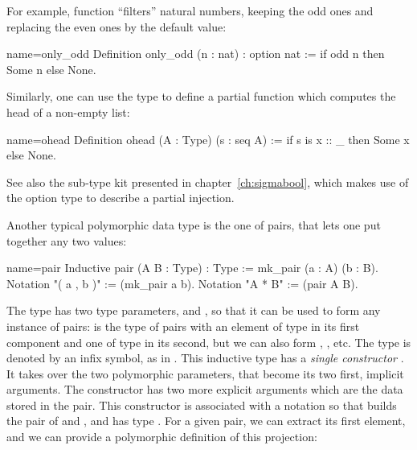 For example, function  ``filters'' natural numbers, keeping the
odd ones and replacing the even ones by the  default value:

\begin{coq}{name=only_odd}{}
Definition only_odd (n : nat) : option nat :=
  if odd n then Some n else None.
\end{coq}

Similarly, one can use the  type to define a partial function
which computes the head of a non-empty list:


\begin{coq}{name=ohead}{}
Definition ohead (A : Type) (s : seq A) :=
  if s is x :: _ then Some x else None.
\end{coq}


See also the sub-type kit presented in chapter~\ref{ch:sigmabool},
which makes use of the option type to describe a partial injection.

Another typical polymorphic data type is the one of pairs, that
lets one put together any two values:
\index[coq]{\C{(_ , _)}}

\begin{coq}{name=pair}{}
Inductive pair (A B : Type) : Type := mk_pair (a : A) (b : B).
Notation "( a , b )" := (mk_pair a b).
Notation "A * B" := (pair A B).
\end{coq}

The type  has two type parameters,  and
, so
that it can be used to form any instance of pairs: 
is the type of pairs with an element of type  in its first
component and one of type  in its second, but we can also form
, , etc. The type  is
denoted by an infix \C{*} symbol, as in .
This inductive type has
a \emph{single constructor} . It takes over the two
polymorphic parameters, that become its two first, implicit arguments.
The constructor  has two more explicit arguments which are
the data stored in the pair. This constructor is associated with
a notation so that  builds the pair of  and , and
 has type . For a given pair, we can
extract its first element, and we can provide a polymorphic definition
of this projection:

